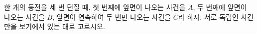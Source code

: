 한 개의 동전을 세 번 던질 때, 첫 번째에 앞면이 나오는 사건을 $A$, 두 번째에 앞면이 나오는 사건을 $B$, 앞면이 연속하여 두 번만 나오는 사건을 $C$라 하자. 서로 독립인 사건만을 보기에서 있는 대로 고르시오. 

